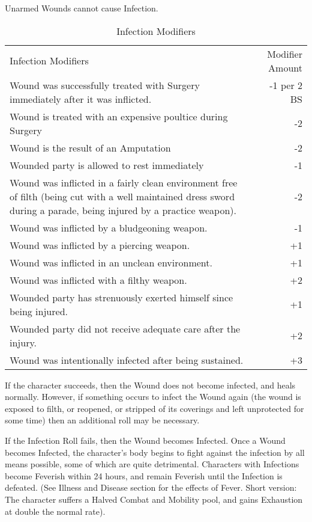 \documentclass[oneside,11pt,english]{book}
\begin{document}
Unarmed Wounds cannot cause Infection.

\begin{table} %
	\centering
	\caption{Infection Modifiers}
	\label{tab:Infection Modifiers}
	\begin{tabu} spread 0pt {Xr}
Infection Modifiers &Modifier Amount\\
Wound was successfully treated with Surgery immediately after it was inflicted. &-1 per 2 BS\\
Wound is treated with an expensive poultice during Surgery &-2\\
Wound is the result of an Amputation &-2\\
Wounded party is allowed to rest immediately &-1\\
Wound was inflicted in a fairly clean environment free of filth (being cut with a well maintained dress sword during a parade, being injured by a practice weapon). &-2\\
Wound was inflicted by a bludgeoning weapon. &-1\\
Wound was inflicted by a piercing weapon. &+1\\
Wound was inflicted in an unclean environment. &+1\\
Wound was inflicted with a filthy weapon. &+2\\
Wounded party has strenuously exerted himself since being injured. &+1\\
Wounded party did not receive adequate care after the injury. &+2\\
Wound was intentionally infected after being sustained. &+3\\
	\end{tabu}
\end{table}
If the character succeeds, then the Wound does not become infected, and heals normally. However, if 
something occurs to infect the Wound again (the wound is exposed to filth, or reopened, or stripped of its 
coverings and left unprotected for some time) then an additional roll may be necessary. 

If the Infection Roll fails, then the Wound becomes Infected. Once a Wound becomes Infected, the 
character’s body begins to fight against the infection by all means possible, some of which are quite 
detrimental. Characters with Infections become Feverish within 24 hours, and remain Feverish until the 
Infection is defeated. (See Illness and Disease section for the effects of Fever. Short version: The 
character suffers a Halved Combat and Mobility pool, and gains Exhaustion at double the normal rate). 
\end{document}

